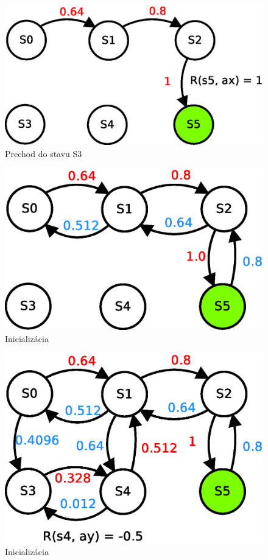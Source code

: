 \begin{figure}[!htb]
\center
\includegraphics[scale=.6]{../diagrams/q_learning_table_04.eps}
\caption{Prechod do stavu S3}
\label{img:q_learning_4}
\end{figure}

\begin{figure}[!htb]
\center
\includegraphics[scale=.6]{../diagrams/q_learning_table_05.eps}
\caption{Inicializácia}
\label{img:q_learning_5}
\end{figure}

\begin{figure}[!htb]
\center
\includegraphics[scale=.6]{../diagrams/q_learning_table_06.eps}
\caption{Inicializácia}
\label{img:q_learning_6}
\end{figure}
